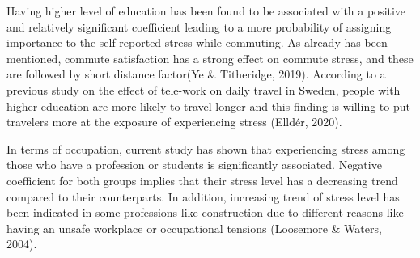 \documentclass[
11pt, %
oneside, %
english, %
singlespacing, %
]{macthesis} %
\begin{document}
Having higher level of education has been found to be associated with a positive and relatively significant coefficient leading to a more probability of assigning importance to the self-reported stress while commuting. As already has been mentioned, commute satisfaction has a strong effect on commute stress, and these are followed by short distance factor(Ye \& Titheridge, 2019). According to a previous study on the effect of tele-work on daily travel in Sweden, people with higher education are more likely to travel longer and this finding is willing to put travelers more at the exposure of experiencing stress (Elldér, 2020).

In terms of occupation, current study has shown that experiencing stress among those who have a profession or students is significantly associated. Negative coefficient for both groups implies that their stress level has a decreasing trend compared to their counterparts. In addition, increasing trend of stress level has been indicated in some professions like construction due to different reasons like having an unsafe workplace or occupational tensions (Loosemore \& Waters, 2004).
\end{document}
